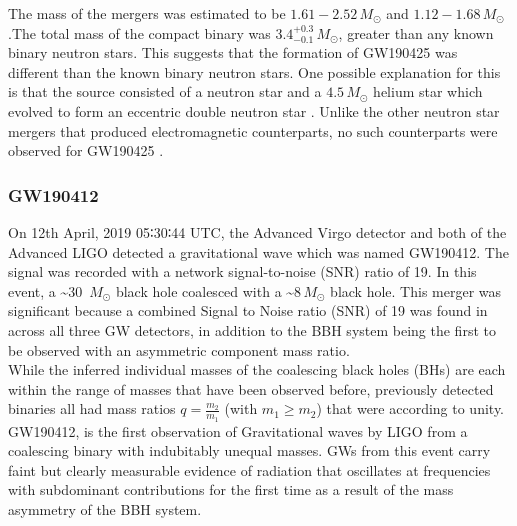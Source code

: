 The mass of the mergers was estimated to be $1.61-2.52\,M_\odot$ and $1.12 - 1.68\,M_\odot$.The total mass of the compact binary was $3.4_{-0.1}^{+0.3}\, M_\odot$, greater than any known binary neutron stars. This suggests that the formation of GW190425 was different than the known binary neutron stars. One possible explanation for this is that the source consisted of a neutron star and a $4.5\,M_\odot$ helium star which evolved to form an eccentric double neutron star \cite{Romero_Shaw_2020}. Unlike the other neutron star mergers that produced electromagnetic counterparts, no such counterparts were observed for GW190425 \cite{GW190425_1}.

\pagebreak

\subsubsection{GW190412}

On 12th April, 2019 05∶30∶44 UTC, the Advanced Virgo detector and both of the Advanced LIGO detected a gravitational wave which was named GW190412. The signal was recorded with a network signal-to-noise (SNR) ratio of 19. In this event, a \sim 30\, $M_\odot$ black hole coalesced with a \sim 8\,$M_\odot$ black hole. This merger was significant because a combined Signal to Noise ratio (SNR) of 19 was found in across all three GW detectors, in addition to the BBH system being the first to be observed with an asymmetric component mass ratio.\\

While the inferred individual masses of the coalescing black holes (BHs) are each within the range of masses that have been observed before, previously detected binaries all had mass ratios $ q = \frac{m_2}{m_1}$ (with $m_1 \geq m_2$) that were according to unity. GW190412, is the first observation of Gravitational waves by LIGO from a coalescing binary with indubitably unequal masses. GWs from this event carry faint but clearly measurable evidence of radiation that oscillates at frequencies with subdominant contributions for the first time as a result of the mass asymmetry of the BBH system.

